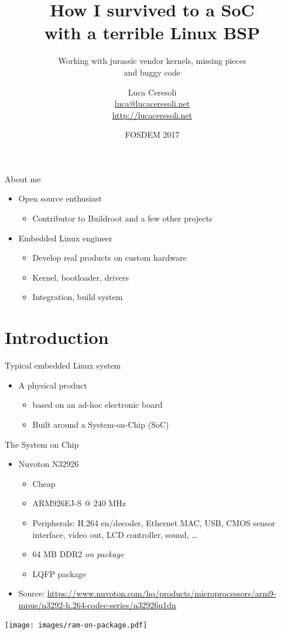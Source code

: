 \documentclass[xetex,table]{beamer}
\title{How I survived to a SoC\\with a terrible Linux BSP}
\subtitle{Working with jurassic vendor kernels, missing pieces\\and buggy code}
\author{Luca Ceresoli\\
  \href{mailto:luca@lucaceresoli.net}{luca@lucaceresoli.net}\\
  \url{http://lucaceresoli.net}
}
\date{FOSDEM 2017}
\begin{document}
\maketitle

\begin{frame}{About me}
  \begin{itemize}
  \item Open source enthusiast
    \begin{itemize}
    \item Contributor to Buildroot and a few other projects
    \end{itemize}
  \item Embedded Linux engineer
    \begin{itemize}
    \item Develop real products on custom hardware
    \item Kernel, bootloader, drivers
    \item Integration, build system
    \end{itemize}
  \end{itemize}
\end{frame}

\section{Introduction}

\begin{frame}{Typical embedded Linux system}
  \begin{itemize}
  \item A physical product
    \begin{itemize}
    \item based on an ad-hoc electronic board
    \item Built around a System-on-Chip (SoC)
    \end{itemize}
  \end{itemize}
\end{frame}

\begin{frame}{The System on Chip}
  \begin{itemize}
  \item Nuvoton N32926
    \begin{itemize}
    \item Cheap
    \item ARM926EJ-S @ 240 MHz
    \item Peripherals: H.264 en/decoder, Ethernet MAC, USB, CMOS
      sensor interface, video out, LCD controller, sound, \dots
    \item 64 MB DDR2 {\em on package}
    \item LQFP package
    \end{itemize}
  \item{\tiny Source:
    \url{https://www.nuvoton.com/hq/products/microprocessors/arm9-mpus/n3292-h.264-codec-series/n32926u1dn}}
  \end{itemize}
  \begin{flushright}
    \texttt{[image: images/ram-on-package.pdf]}
  \end{flushright}
\end{frame}
\end{document}
